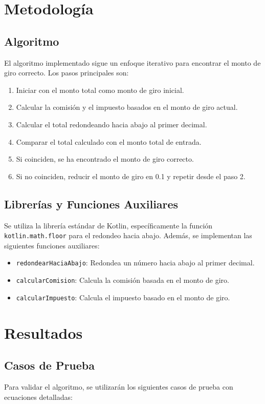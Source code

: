 \documentclass[11pt,a4paper]{article}
\begin{document}
\section{Metodología}

\subsection{Algoritmo}
El algoritmo implementado sigue un enfoque iterativo para encontrar el monto de giro correcto. Los pasos principales son:

\begin{enumerate}
    \item  Iniciar con el monto total como monto de giro inicial.
    \item  Calcular la comisión y el impuesto basados en el monto de giro actual.
    \item  Calcular el total redondeando hacia abajo al primer decimal.
    \item  Comparar el total calculado con el monto total de entrada.
    \item  Si coinciden, se ha encontrado el monto de giro correcto.
    \item  Si no coinciden, reducir el monto de giro en 0.1 y repetir desde el paso 2.
\end{enumerate}

\subsection{Librerías y Funciones Auxiliares}
Se utiliza la librería estándar de Kotlin, específicamente la función \texttt{kotlin.math.floor} para el redondeo hacia abajo. Además, se implementan las siguientes funciones auxiliares:

\begin{itemize}
    \item \texttt{redondearHaciaAbajo}: Redondea un número hacia abajo al primer decimal.
    \item \texttt{calcularComision}: Calcula la comisión basada en el monto de giro.
    \item \texttt{calcularImpuesto}: Calcula el impuesto basado en el monto de giro.
\end{itemize}

\section{Resultados}

\subsection{Casos de Prueba}
Para validar el algoritmo, se utilizarán los siguientes casos de prueba con ecuaciones detalladas:
\end{document}
